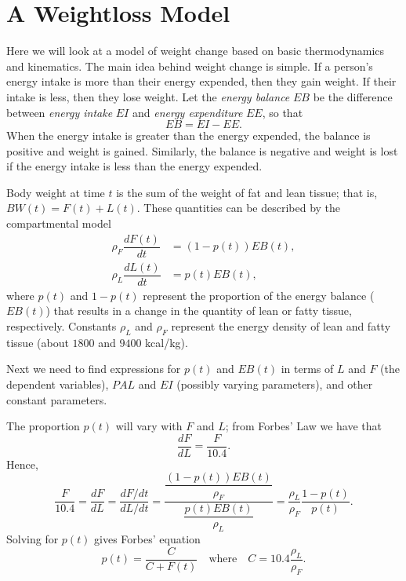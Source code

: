 \label{lab:Weightloss}

\section*{A Weightloss Model}
Here we will look at a model of weight change based on basic thermodynamics and kinematics.
The main idea behind weight change is simple.
If a person's energy intake is more than their energy expended, then they gain weight.
If their intake is less, then they lose weight.
Let the \emph{energy balance} $EB$ be the difference between \emph{energy intake} $EI$ and \emph{energy expenditure} $EE$, so that
\begin{equation}
\label{eqn:EB}
EB = EI - EE.
\end{equation}
When the energy intake is greater than the energy expended, the balance is positive and weight is gained.
Similarly, the balance is negative and weight is lost if the energy intake is less than the energy expended.

Body weight at time $t$ is the sum of the weight of fat and lean tissue; that is,  $BW(t) = F(t) + L(t).$
These quantities can be described by the compartmental model
\begin{subequations}
\label{eqn:compartment}
\begin{align}
\rho_F \dfrac{dF(t)}{dt} &= (1-p(t)) EB(t),\label{eqn:compartment:a}\\
\rho_L \dfrac{dL(t)}{dt} &= p(t) EB(t),\label{eqn:compartment:b}
\end{align}
\end{subequations}
where $p(t)$ and $1-p(t)$ represent the proportion of the energy balance ($EB(t)$) that results in a change in the quantity of lean or fatty tissue, respectively.
Constants $\rho_L$ and $\rho_F$ represent the energy density of lean and fatty tissue (about $1800$ and $9400$ kcal/kg).

Next we need to find expressions for $p(t)$ and $EB(t)$ in terms of $L$ and $F$ (the dependent variables), $PAL$ and $EI$ (possibly varying parameters), and other constant parameters.

 The proportion $p(t)$ will vary with $F$ and $L$; from Forbes' Law \cite{Fo.2} we have that
\begin{equation}
\label{eqn:forbes}
\dfrac{dF}{dL} = \dfrac{F}{10.4}.
\end{equation}
Hence,
\[
\dfrac{F}{10.4} = \dfrac{dF}{dL} = \dfrac{dF/dt}{dL/dt} = \dfrac{\dfrac{(1-p(t)) EB(t)}{\rho_F}}{\dfrac{p(t) EB(t)}{\rho_L}} = \dfrac{\rho_L}{\rho_F} \dfrac{1-p(t)}{p(t)}.
\]
Solving for $p(t)$ gives Forbes' equation
\begin{equation}
\label{eqn:Forbes2}
p(t) = \dfrac{C}{C+F(t)}\quad\mbox{where}\quad C=10.4\dfrac{\rho_L}{\rho_F}.
\end{equation}

